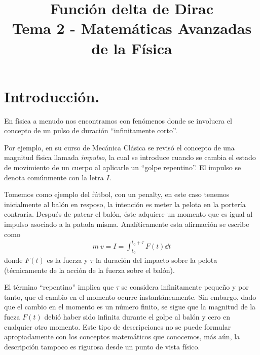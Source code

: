 
\author{}
\title{Función delta de Dirac \\ \large {Tema 2 - Matemáticas Avanzadas de la Física}  \vspace{-1.5\baselineskip}}
\date{}

\renewcommand\labelenumii{\theenumi.{\arabic{enumii}}}
\maketitle
\fontsize{14}{14}\selectfont
\section{Introducción.}
En física a menudo nos encontramos con fenómenos donde se involucra el concepto de un pulso de duración \enquote{infinitamente corto}.
\par
Por ejemplo, en su curso de Mecánica Clásica se revisó el concepto de una magnitud física llamada \emph{impulso}, la cual se introduce cuando se cambia el estado de movimiento de un cuerpo al aplicarle un \enquote{golpe repentino}. El impulso se denota comúnmente con la letra $I$.
\par
Tomemos como ejemplo del fútbol, con un penalty, en este caso tenemos inicialmente al balón en resposo, la intención es meter la pelota en la portería contraria. Después de patear el balón, éste adquiere un momento que es igual al impulso asociado a la patada misma. Analíticamente esta afirmación se escribe como
\begin{align*}
m \: v = I = \int_{t_{0}}^{t_{0} + \tau} F(t) \dd{t}
\end{align*}
donde $F(t)$ es la fuerza y $\tau$ la duración del impacto sobre la pelota (técnicamente de la acción de la fuerza sobre el balón).
\par
El término \enquote{repentino} implica que $\tau$ se considera infinitamente pequeño y por tanto, que el cambio en el momento ocurre instantáneamente. Sin embargo, dado que el cambio en el momento es un número finito, se sigue que la magnitud de la fueza $F(t)$ debió haber sido infinita durante el golpe al balón y cero en cualquier otro momento. Este
tipo de descripciones no se puede formular apropiadamente con los conceptos matemáticos que conocemos, más aún, la descripción tampoco es rigurosa desde un punto de vista físico.
